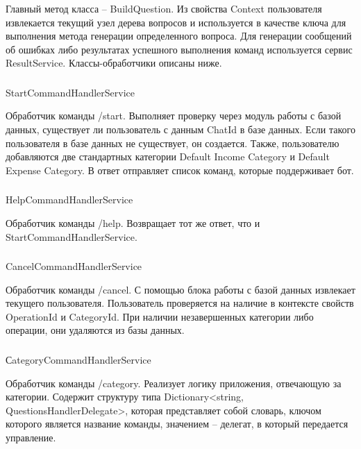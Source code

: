 Главный метод класса – BuildQuestion. Из свойства Context пользователя извлекается текущий узел дерева вопросов и используется в качестве ключа для выполнения метода генерации определенного вопроса.
Для генерации сообщений об ошибках либо результатах успешного выполнения команд используется сервис ResultService.
Классы-обработчики описаны ниже.

\subsubsection{} StartCommandHandlerService
\label{sec:design:server:StartCommandHandlerService}

Обработчик команды /start. Выполняет проверку через модуль работы с базой данных, существует ли пользователь с данным ChatId в базе данных. Если такого пользователя в базе данных не существует, он создается. Также, пользователю добавляются две стандартных категории Default Income Category и Default Expense Category. В ответ отправляет список команд, которые поддерживает бот.

\subsubsection{} HelpCommandHandlerService
\label{sec:design:server:HelpCommandHandlerService}

Обработчик команды /help. Возвращает тот же ответ, что и \linebreak StartCommandHandlerService.

\subsubsection{} CancelCommandHandlerService
\label{sec:design:server:CancelCommandHandlerService}

Обработчик команды /cancel. С помощью блока работы с базой данных извлекает текущего пользователя. Пользователь проверяется на наличие в контексте свойств OperationId и CategoryId. При наличии незавершенных категории либо операции, они удаляются из базы данных.

\subsubsection{} СategoryCommandHandlerService
\label{sec:design:server:СategoryCommandHandlerService}

Обработчик команды /category. Реализует логику приложения, отвечающую за категории. Содержит структуру типа Dictionary<string, \linebreak QuestionsHandlerDelegate>, которая представляет собой словарь, ключом которого является название команды, значением – делегат, в который передается управление.

